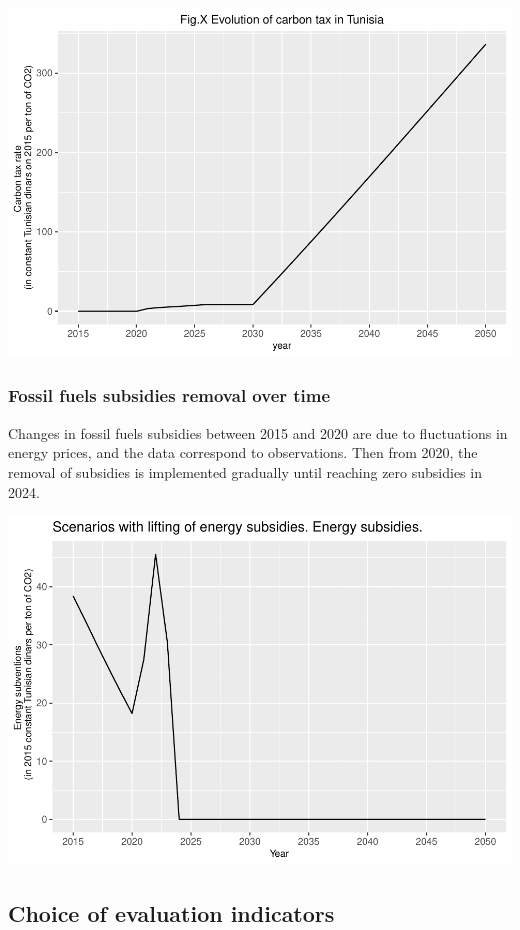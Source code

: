 \documentclass[
]{article}
\begin{document}
\begin{center}\includegraphics[width=0.7\linewidth,height=0.7\textheight]{Modele-ThreeMe-Tunisie_Sequeira_Valilou_Wang_files/figure-latex/unnamed-chunk-6-1} \end{center}

\hypertarget{fossil-fuels-subsidies-removal-over-time}{%
\subsubsection{Fossil fuels subsidies removal over
time}\label{fossil-fuels-subsidies-removal-over-time}}

Changes in fossil fuels subsidies between 2015 and 2020 are due to
fluctuations in energy prices, and the data correspond to observations.
Then from 2020, the removal of subsidies is implemented gradually until
reaching zero subsidies in 2024.

\begin{center}\includegraphics[width=0.7\linewidth,height=0.7\textheight]{Modele-ThreeMe-Tunisie_Sequeira_Valilou_Wang_files/figure-latex/unnamed-chunk-7-1} \end{center}

\hypertarget{choice-of-evaluation-indicators}{%
\subsection{Choice of evaluation
indicators}\label{choice-of-evaluation-indicators}}
\end{document}
